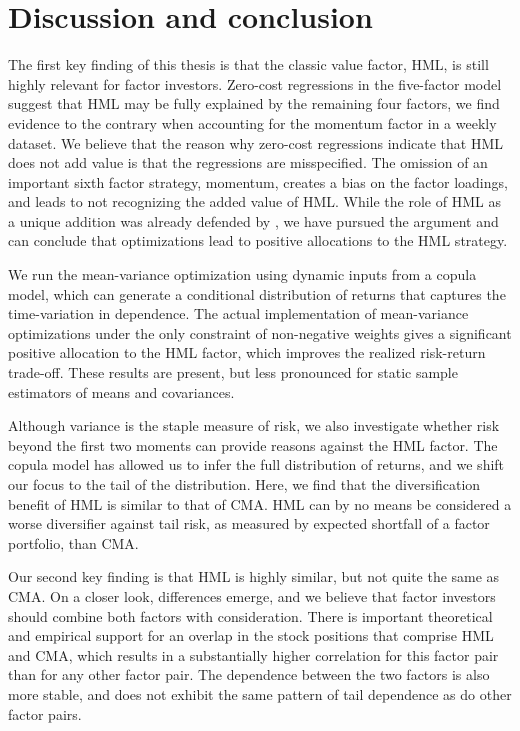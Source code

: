 
\section{Discussion and conclusion} %
\label{sec:discussion_conclusion}

The first key finding of this thesis is that the classic value factor, HML, is still highly relevant for factor investors. Zero-cost regressions in the five-factor model suggest that HML may be fully explained by the remaining four factors, we find evidence to the contrary when accounting for the momentum factor in a weekly dataset. We believe that the reason why zero-cost regressions indicate that HML does not add value is that the regressions are misspecified. The omission of an important sixth factor strategy, momentum, creates a bias on the factor loadings, and leads to not recognizing the added value of HML. While the role of HML as a unique addition was already defended by \textcite{Asness2015}, we have pursued the argument and can conclude that optimizations lead to positive allocations to the HML strategy.

We run the mean-variance optimization using dynamic inputs from a copula model, which can generate a conditional distribution of returns that captures the time-variation in dependence. The actual implementation of mean-variance optimizations under the only constraint of non-negative weights gives a significant positive allocation to the HML factor, which improves the realized risk-return trade-off. These results are present, but less pronounced for static sample estimators of means and covariances.

Although variance is the staple measure of risk, we also investigate whether risk beyond the first two moments can provide reasons against the HML factor. The copula model has allowed us to infer the full distribution of returns, and we shift our focus to the tail of the distribution. Here, we find that the diversification benefit of HML is similar to that of CMA. HML can by no means be considered a worse diversifier against tail risk, as measured by expected shortfall of a factor portfolio, than CMA.

Our second key finding is that HML is highly similar, but not quite the same as CMA. On a closer look, differences emerge, and we believe that factor investors should combine both factors with consideration. There is important theoretical and empirical support for an overlap in the stock positions that comprise HML and CMA, which results in a substantially higher correlation for this factor pair than for any other factor pair. The dependence between the two factors is also more stable, and does not exhibit the same pattern of tail dependence as do other factor pairs. 


